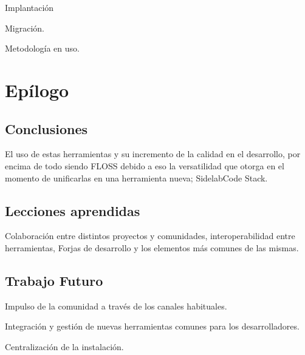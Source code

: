 \documentclass[11pt]{scrartcl}
\begin{document}
\par Implantación
\par Migración.
\par Metodología en uso.


\section{Epílogo}
\label{sec:epílogo}

\subsection{Conclusiones}
\label{sub:conclusiones}

\par El uso de estas herramientas y su incremento de la calidad en el desarrollo, por encima de todo siendo FLOSS debido a eso la versatilidad que otorga en el momento de unificarlas en una herramienta nueva; SidelabCode Stack.


\subsection{Lecciones aprendidas}
\label{sub:lecciones}

\par Colaboraci\'on entre distintos proyectos y comunidades, interoperabilidad entre herramientas, Forjas de desarrollo y los elementos m\'as comunes de las mismas.

\subsection{Trabajo Futuro}
\label{sub:trabajofuturo}

\par Impulso de la comunidad a través de los canales habituales.

\par Integraci\'on y gesti\'on de nuevas herramientas comunes para los desarrolladores.

\par Centralizaci\'on de la instalaci\'on.

\end{document}
